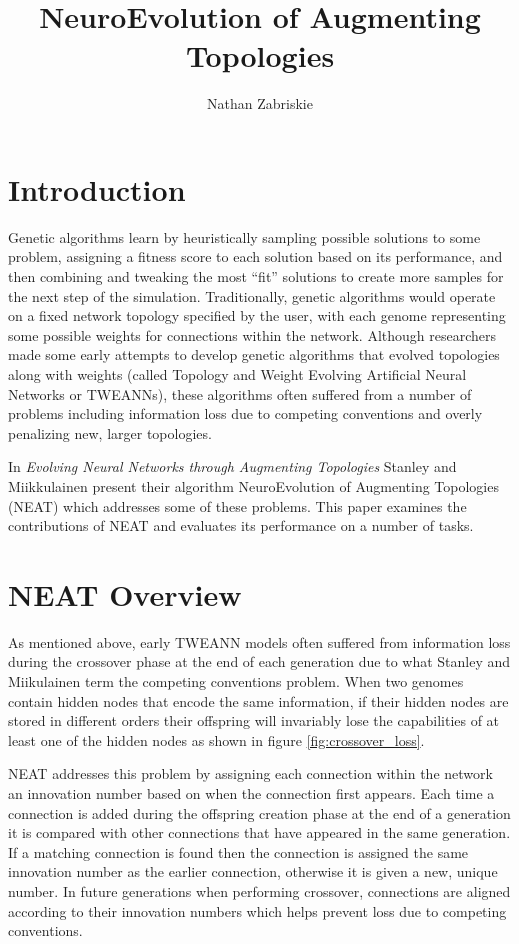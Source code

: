 \documentclass[twocolumn,letterpaper]{article}
\title{NeuroEvolution of Augmenting Topologies}
\author{Nathan Zabriskie}
\begin{document}
\maketitle

\section{Introduction} \label{sec:intro} 
Genetic algorithms learn by heuristically sampling possible solutions to some problem, assigning a fitness
score to each solution based on its performance, and then combining and tweaking the most 
``fit'' solutions to create more samples for the next step of the simulation. Traditionally, 
genetic algorithms would operate on a fixed network topology specified by the user, with each 
genome representing some possible weights for connections within the network. Although
researchers made some early attempts to develop genetic algorithms that evolved topologies along with 
weights (called Topology and Weight Evolving Artificial Neural Networks or TWEANNs), 
these algorithms often suffered from a number of problems including information loss due to competing 
conventions and overly penalizing new, larger topologies. 

In \textit{Evolving Neural Networks through Augmenting Topologies} \cite{neat_paper} Stanley and 
Miikkulainen present their algorithm NeuroEvolution of Augmenting Topologies (NEAT) which addresses some of
these problems. This paper examines the contributions of NEAT and evaluates its performance on a number
of tasks.

\section{NEAT Overview} \label{sec:overview}
As mentioned above, early TWEANN models often suffered from information loss during the crossover phase
at the end of each generation due to what Stanley and Miikulainen term the competing conventions problem.
When two genomes contain hidden nodes that encode the same information, if their hidden nodes are stored 
in different orders their offspring will invariably lose the capabilities of at least one of the 
hidden nodes as shown in figure \ref{fig:crossover_loss}. 

NEAT addresses this problem by assigning each connection within the network an innovation number based on
when the connection first appears. Each time a connection is added during the offspring creation phase at the end of a generation it is compared with other connections that have appeared in the same generation. 
If a matching connection is found then the connection is assigned the same innovation number as the earlier
connection, otherwise it is given a new, unique number. In future generations when performing crossover,
connections are aligned according to their innovation numbers which helps prevent loss due to competing
conventions. 
\end{document}
